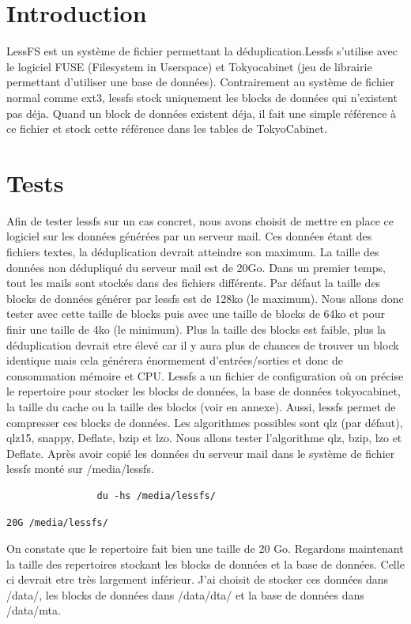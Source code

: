 \documentclass[a4paper]{report}
\begin{document}
		\section{Introduction}
		LessFS est un système de fichier permettant la déduplication.Lessfs s'utilise avec le logiciel FUSE (Filesystem in Userspace) et Tokyocabinet (jeu de librairie permettant d'utiliser une base de données). Contrairement au système de fichier normal comme ext3, lessfs stock uniquement les blocks de données qui n'existent pas déja. Quand un block de données existent déja, il fait une simple référence à ce fichier et stock cette référence dans les tables de TokyoCabinet.
		\section{Tests}
			Afin de tester lessfs sur un cas concret, nous avons choisit de mettre en place ce logiciel sur les données générées par un serveur mail. Ces données étant des fichiers textes, la déduplication devrait atteindre son maximum. La taille des données non dédupliqué du serveur mail est de 20Go. Dans un premier temps, tout les mails sont stockés dans des fichiers différents. Par défaut la taille des blocks de données générer par lessfs est de 128ko (le maximum). Nous allons donc tester avec cette taille de blocks puis avec une taille de blocks de 64ko et pour finir une taille de 4ko (le minimum). Plus la taille des blocks est faible, plus la déduplication devrait etre élevé car il y aura plus de chances de trouver un block identique mais cela générera énormement d'entrées/sorties et donc de consommation mémoire et CPU. Lessfs a un fichier de configuration où on précise le repertoire pour stocker les blocks de données, la base de données tokyocabinet, la taille du cache ou la taille des blocks (voir en annexe). Aussi, lessfs permet de compresser ces blocks de données. Les algorithmes possibles sont qlz (par défaut), qlz15, snappy, Deflate, bzip et lzo. Nous allons tester l'algorithme qlz, bzip, lzo et Deflate. Après avoir copié les données du serveur mail dans le système de fichier lessfs monté sur /media/lessfs. \\
			\begin{lstlisting}
				du -hs /media/lessfs/
			\end{lstlisting}
			\begin{lstlisting}[backgroundcolor=\color{yellow}]
				20G	/media/lessfs/
			\end{lstlisting}
			On constate que le repertoire fait bien une taille de 20 Go. Regardons maintenant la taille des repertoires stockant les blocks de données et la base de données. Celle ci devrait etre très largement inférieur. J'ai choisit de stocker ces données dans /data/, les blocks de données dans /data/dta/ et la base de données dans /data/mta.\\
\end{document}
